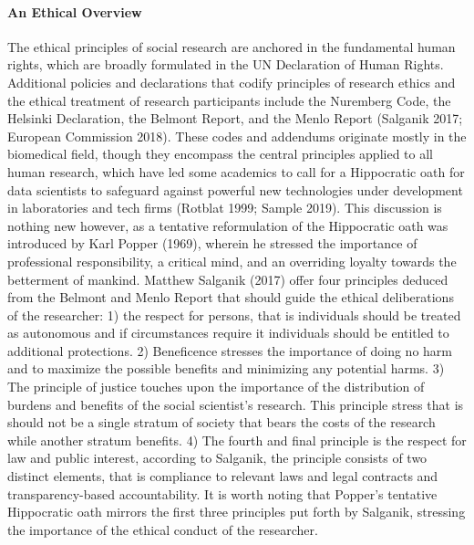 \documentclass[10pt,a4paper]{report}
\begin{document}
\paragraph{An Ethical Overview \newline}
The ethical principles of social research are anchored in the fundamental human rights, which are broadly formulated in the UN Declaration of Human Rights. Additional policies and declarations that codify principles of research ethics and the ethical treatment of research participants include the Nuremberg Code, the Helsinki Declaration, the Belmont Report, and the Menlo Report (Salganik 2017; European Commission 2018). These codes and addendums originate mostly in the biomedical field, though they encompass the central principles applied to all human research, which have led some academics to call for a Hippocratic oath for data scientists to safeguard against powerful new technologies under development in laboratories and tech firms (Rotblat 1999; Sample 2019). This discussion is nothing new however, as a tentative reformulation of the Hippocratic oath was introduced by Karl Popper (1969), wherein he stressed the importance of professional responsibility, a critical mind, and an overriding loyalty towards the betterment of mankind.\newline
Matthew Salganik (2017) offer four principles deduced from the Belmont and Menlo Report that should guide the ethical deliberations of the researcher: 1) the respect for persons, that is individuals should be treated as autonomous and if circumstances require it individuals should be entitled to additional protections. 2) Beneficence stresses the importance of doing no harm and to maximize the possible benefits and minimizing any potential harms. 3) The principle of justice touches upon the importance of the distribution of burdens and benefits of the social scientist's research. This principle stress that is should not be a single stratum of society that bears the costs of the research while another stratum benefits. 4) The fourth and final principle is the respect for law and public interest, according to Salganik, the principle consists of two distinct elements, that is compliance to relevant laws and legal contracts and transparency-based accountability. It is worth noting that Popper’s tentative Hippocratic oath mirrors the first three principles put forth by Salganik, stressing the importance of the ethical conduct of the researcher.\newline
\end{document}
